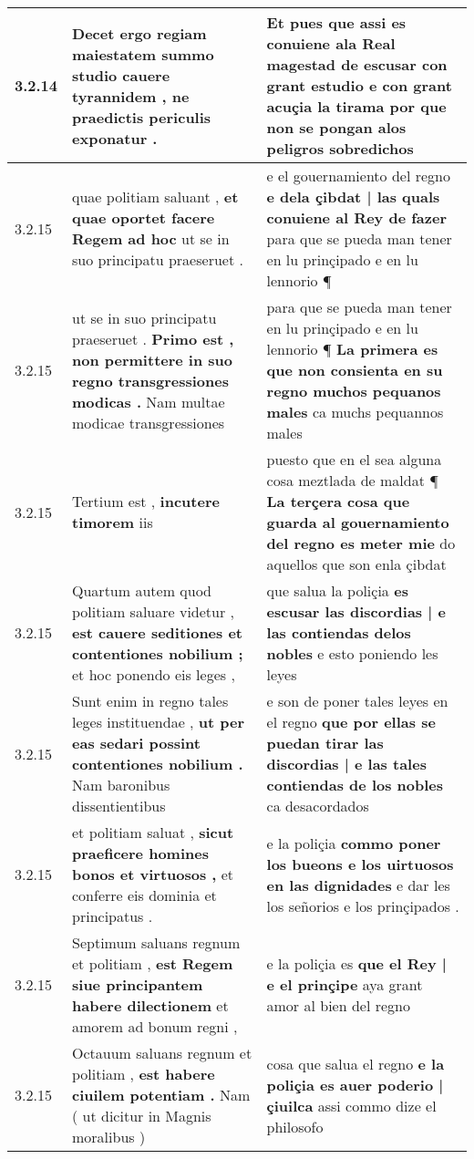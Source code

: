 \begin{tabular}{|p{1cm}|p{6.5cm}|p{6.5cm}|}
3.2.14 & Decet ergo regiam maiestatem \textbf{ summo studio cauere tyrannidem , } ne praedictis periculis exponatur . & Et pues que assi es conuiene ala Real magestad de escusar con grant estudio \textbf{ e con grant acuçia la tirama } por que non se pongan alos peligros sobredichos \\\hline
3.2.15 & quae politiam saluant , \textbf{ et quae oportet facere Regem ad hoc } ut se in suo principatu praeseruet . & e el gouernamiento del regno \textbf{ e dela çibdat | las quals conuiene al Rey de fazer } para que se pueda man tener en lu prinçipado e en lu lennorio ¶ \\\hline
3.2.15 & ut se in suo principatu praeseruet . \textbf{ Primo est , non permittere in suo regno transgressiones modicas . } Nam multae modicae transgressiones & para que se pueda man tener en lu prinçipado e en lu lennorio ¶ \textbf{ La primera es que non consienta en su regno muchos pequanos males } ca muchs pequannos males \\\hline
3.2.15 & Tertium est , \textbf{ incutere timorem } iis & puesto que en el sea alguna cosa meztlada de maldat ¶ \textbf{ La terçera cosa que guarda al gouernamiento del regno es meter mie } do aquellos que son enla çibdat \\\hline
3.2.15 & Quartum autem quod politiam saluare videtur , \textbf{ est cauere seditiones et contentiones nobilium ; } et hoc ponendo eis leges , & que salua la poliçia \textbf{ es escusar las discordias | e las contiendas delos nobles } e esto poniendo les leyes \\\hline
3.2.15 & Sunt enim in regno tales leges instituendae , \textbf{ ut per eas sedari possint contentiones nobilium . } Nam baronibus dissentientibus & e son de poner tales leyes en el regno \textbf{ que por ellas se puedan tirar las discordias | e las tales contiendas de los nobles } ca desacordados \\\hline
3.2.15 & et politiam saluat , \textbf{ sicut praeficere homines bonos et virtuosos , } et conferre eis dominia et principatus . & e la poliçia \textbf{ commo poner los bueons e los uirtuosos en las dignidades } e dar les los señorios e los prinçipados . \\\hline
3.2.15 & Septimum saluans regnum et politiam , \textbf{ est Regem siue principantem habere dilectionem } et amorem ad bonum regni , & e la poliçia es \textbf{ que el Rey | e el prinçipe } aya grant amor al bien del regno \\\hline
3.2.15 & Octauum saluans regnum et politiam , \textbf{ est habere ciuilem potentiam . } Nam ( ut dicitur in Magnis moralibus ) & cosa que salua el regno \textbf{ e la poliçia es auer poderio | çiuilca } assi commo dize el philosofo \\\hline

\end{tabular}
